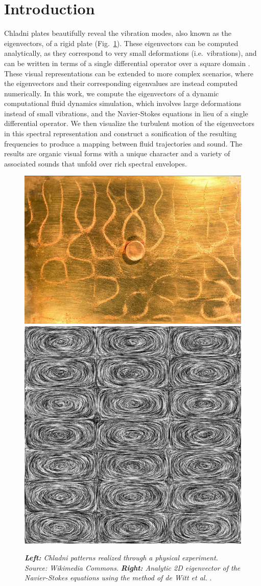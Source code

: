 \documentclass[11pt]{article}
\begin{document}
\section*{Introduction}
Chladni plates beautifully reveal the vibration modes, also known as the eigenvectors, of a rigid plate (Fig.~\ref{fig:chladni-plate}). These eigenvectors can be computed analytically, as they correspond to very small deformations (i.e.~vibrations), and can be written in terms of a single differential operator over a square domain \cite{gander2012euler}. These visual representations can be extended to more complex scenarios, where the eigenvectors and their corresponding eigenvalues are instead computed numerically. In this work, we compute the eigenvectors of a dynamic computational fluid dynamics simulation, which involves large deformations instead of small vibrations, and the Navier-Stokes equations in lieu of a single differential operator. We then visualize the turbulent motion of the eigenvectors in this spectral representation and construct a sonification of the resulting frequencies to produce a mapping between fluid trajectories and sound. The results are organic visual forms with a unique character and a variety of associated sounds that unfold over rich spectral envelopes.

\begin{figure}
		\centering
		\includegraphics[height=0.3\textwidth]{Figures/chladni_plate.jpg}
		\includegraphics[height=0.3\textwidth]{Figures/LIC.jpg}
		\caption{{\em{\bf Left:} Chladni patterns realized through a physical experiment. Source: Wikimedia Commons.} {\em{\bf Right:} Analytic 2D eigenvector of the Navier-Stokes equations using the method of de Witt et al.} \cite{deWitt:2012}.}
		\label{fig:chladni-plate}
\end{figure}
\end{document}
